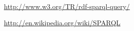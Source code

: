 \begin{thebibliography}{99}



  \url{http://www.w3.org/TR/rdf-sparql-query/}

  \url{http://en.wikipedia.org/wiki/SPARQL}





\end{thebibliography}







